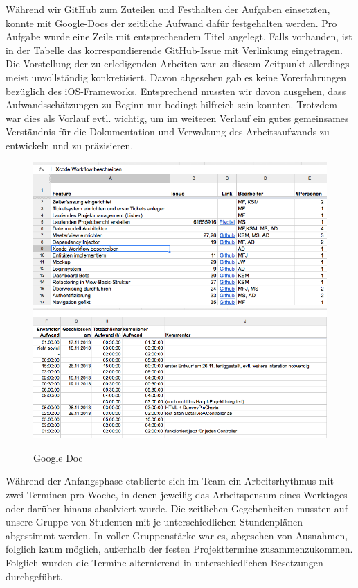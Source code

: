 	Während wir GitHub zum Zuteilen und Festhalten der Aufgaben einsetzten, konnte mit Google-Docs der zeitliche Aufwand dafür festgehalten werden. Pro Aufgabe wurde eine Zeile mit entsprechendem Titel angelegt. Falls vorhanden, ist in der Tabelle das korrespondierende GitHub-Issue mit Verlinkung eingetragen. Die Vorstellung der zu erledigenden Arbeiten war zu diesem Zeitpunkt allerdings meist unvollständig konkretisiert. Davon abgesehen gab es keine Vorerfahrungen bezüglich des iOS-Frameworks. Entsprechend mussten wir davon ausgehen, dass Aufwandsschätzungen zu Beginn nur bedingt hilfreich sein konnten. Trotzdem war dies als Vorlauf evtl. wichtig, um im weiteren Verlauf ein gutes gemeinsames Verständnis für die Dokumentation und Verwaltung des Arbeitsaufwands zu entwickeln und zu präzisieren. 

\begin{figure}[h]
	\centering
	\includegraphics[scale=.25]{Pictures/gdocs1} \\
	\includegraphics[scale=.25]{Pictures/gdocs2}
	\caption{Google Doc\label{fig:GDoc}}
\end{figure}

	Während der Anfangsphase etablierte sich im Team ein Arbeitsrhythmus mit zwei Terminen pro Woche, in denen jeweilig das Arbeitspensum eines Werktages oder darüber hinaus absolviert wurde. Die zeitlichen Gegebenheiten mussten auf unsere Gruppe von Studenten mit je unterschiedlichen Stundenplänen abgestimmt werden. In voller Gruppenstärke war es, abgesehen von Ausnahmen, folglich kaum möglich, außerhalb der festen Projekttermine zusammenzukommen. Folglich wurden die Termine alternierend in unterschiedlichen Besetzungen durchgeführt. 

